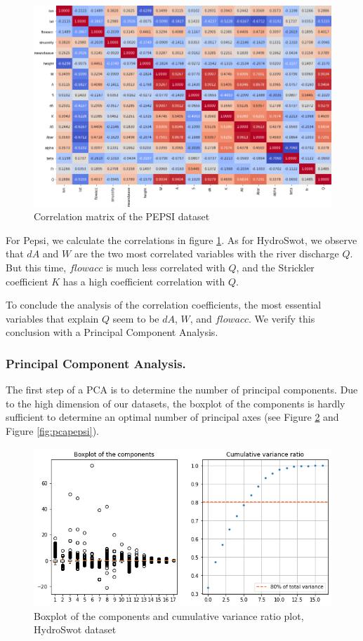 \begin{figure}[H]
\centering
\includegraphics[scale=0.4]{Graph/correlation_pepsi.png}
\caption{Correlation matrix of the PEPSI dataset}
\label{fig:corP}
\end{figure}

For Pepsi, we calculate the correlations in figure \ref{fig:corP}. As for HydroSwot, we observe that $dA$ and $W$ are the two most correlated variables with the river discharge $Q$. But this time, $flowacc$ is much less correlated with $Q$, and the Strickler coefficient $K$ has a high coefficient correlation with $Q$.\newline

To conclude the analysis of the correlation coefficients, the most essential variables that explain $Q$ seem to be $dA$, $W$, and $flowacc$. We verify this conclusion with a Principal Component Analysis. 

\subsubsection{Principal Component Analysis.}

The first step of a PCA is to determine the number of principal components. Due to the high dimension of our datasets, the boxplot of the components is hardly sufficient to determine an optimal number of principal axes (see Figure \ref{fig:pcahydro} and Figure \ref{fig:pcapepsi}). 
 
 \begin{figure}[H]
     \centering
     \includegraphics[scale = 0.55]{Graph/hydro_pca.png}
     \caption{Boxplot of the components and cumulative variance ratio plot, HydroSwot dataset}
     \label{fig:pcahydro}
 \end{figure}
 
